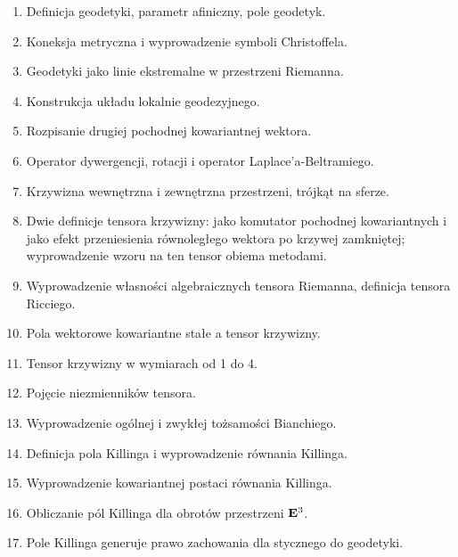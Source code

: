 \documentclass[a4paper,11pt]{article}
\begin{document}
\begin{enumerate}
\item Definicja geodetyki, parametr afiniczny, pole geodetyk.

\item Koneksja metryczna i wyprowadzenie symboli Christoffela.

\item Geodetyki jako linie ekstremalne w przestrzeni Riemanna.

\item Konstrukcja układu lokalnie geodezyjnego.

\item Rozpisanie drugiej pochodnej kowariantnej wektora.

\item Operator dywergencji, rotacji i operator Laplace’a-Beltramiego.

\item Krzywizna wewnętrzna i zewnętrzna przestrzeni, trójkąt na
  sferze.

\item Dwie definicje tensora krzywizny: jako komutator pochodnej
  kowariantnych i jako efekt przeniesienia równoległego wektora po
  krzywej zamkniętej; wyprowadzenie wzoru na ten tensor obiema
  metodami.

\item Wyprowadzenie własności algebraicznych tensora Riemanna,
  definicja tensora Ricciego.

\item Pola wektorowe kowariantne stałe a tensor krzywizny.

\item Tensor krzywizny w wymiarach od 1 do 4.

\item Pojęcie niezmienników tensora.

\item Wyprowadzenie ogólnej i zwykłej tożsamości Bianchiego.

\item Definicja pola Killinga i wyprowadzenie równania Killinga.

\item Wyprowadzenie kowariantnej postaci równania Killinga.

\item Obliczanie pól Killinga dla obrotów przestrzeni $\mathbf{E}^{ 3 }$.

\item Pole Killinga generuje prawo zachowania dla stycznego do
  geodetyki.



\end{enumerate}
\end{document}
